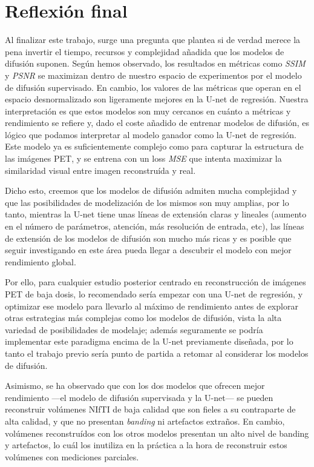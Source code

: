 \section{Reflexión final}
\label{sec:reflexion}

Al finalizar este trabajo, surge una pregunta que plantea si de verdad merece la pena invertir el tiempo, 
recursos y complejidad añadida que los modelos de difusión suponen. Según hemos observado, los resultados en métricas
como \emph{SSIM} y \emph{PSNR} se maximizan dentro de nuestro espacio de experimentos por el modelo de difusión supervisado. 
En cambio, los valores de las métricas que operan en el espacio desnormalizado son ligeramente mejores en la U-net de regresión. 
Nuestra interpretación es que estos modelos son muy cercanos en cuánto a métricas y rendimiento se refiere y, 
dado el coste añadido de entrenar modelos de difusión, es lógico que podamos interpretar al modelo ganador como la 
U-net de regresión. Este modelo ya es suficientemente complejo como para capturar la estructura de las imágenes PET, 
y se entrena con un loss \emph{MSE} que intenta maximizar la similaridad visual entre imagen reconstruída y real. 

Dicho esto, creemos que los modelos de difusión admiten mucha complejidad y que las posibilidades de modelización de los mismos son
muy amplias, por lo tanto, mientras la U-net tiene unas líneas de extensión claras y lineales (aumento en el número de parámetros, atención, más resolución de entrada, etc),
las líneas de extensión de los modelos de difusión son mucho más ricas y es posible que seguir investigando en este área pueda llegar a descubrir el modelo con mejor rendimiento global.

Por ello, para cualquier estudio posterior centrado en reconstrucción de imágenes PET de baja dosis, lo recomendado sería
empezar con una U-net de regresión, y optimizar ese modelo para llevarlo al máximo de rendimiento antes de
explorar otras estrategias más complejas como los modelos de difusión, vista la alta variedad de posibilidades de modelaje; además 
seguramente se podría implementar este paradigma encima de la U-net previamente diseñada, por lo tanto el trabajo previo sería punto de partida a retomar al considerar los modelos de difusión.

Asimismo, se ha observado que con los dos modelos que ofrecen mejor rendimiento ---el modelo de difusión 
supervisada y la U-net--- se pueden reconstruir volúmenes NIfTI de baja calidad que son fieles a su 
contraparte de alta calidad, y que no presentan \emph{banding} ni artefactos extraños. En cambio, volúmenes
reconstruídos con los otros modelos presentan un alto nivel de banding y artefactos, lo cuál los inutiliza
en la práctica a la hora de reconstruir estos volúmenes con mediciones parciales.

